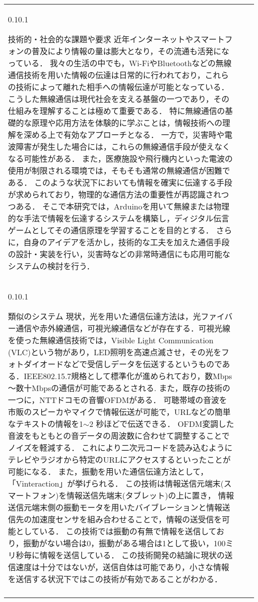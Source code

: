 \documentclass[a4j,11pt,dvipdfmx]{jsarticle}
\makeatletter
\renewcommand{\subsection}{%
    \@startsection{subsection}{1}{\z@}%
    {0.1\Cvs}{0.1\Cvs}%
    {\normalfont\headfont\raggedright}}
\newcommand{\bhline}{\noalign{\hrule height 1pt}}
\makeatother
\begin{document}
\begin{table}[H]
\vspace{-1em}
\centering
\begin{tabular}{bp{}b}
\bhline
\subsection{技術的・社会的な課題や要求}
近年インターネットやスマートフォンの普及により情報の量は膨大となり，その流通も活発になっている\cite{1}．
我々の生活の中でも，Wi-FiやBluetoothなどの無線通信技術を用いた情報の伝達は日常的に行われており，これらの技術によって離れた相手への情報伝達が可能となっている\cite{2}．
こうした無線通信は現代社会を支える基盤の一つであり，その仕組みを理解することは極めて重要である．
特に無線通信の基礎的な原理や応用方法を体験的に学ぶことは，情報技術への理解を深める上で有効なアプローチとなる．
一方で，災害時や電波障害が発生した場合には，これらの無線通信手段が使えなくなる可能性がある．
また，医療施設や飛行機内といった電波の使用が制限される環境では，そもそも通常の無線通信が困難である．
このような状況下においても情報を確実に伝達する手段が求められており，物理的な通信方法の重要性が再認識されつつある\cite{2.5}．
そこで本研究では，Arduinoを用いて無線または物理的な手法で情報を伝達するシステムを構築し，ディジタル伝言ゲームとしてその通信原理を学習することを目的とする．
さらに，自身のアイデアを活かし，技術的な工夫を加えた通信手段の設計・実装を行い，災害時などの非常時通信にも応用可能なシステムの検討を行う．	
	\\ \bhline
\subsection{類似のシステム}
現状，光を用いた通信伝達方法は，光ファイバー通信や赤外線通信，可視光線通信などが存在する．可視光線を使った無線通信技術では，Visible Light Communication (VLC)という物があり，LED照明を高速点滅させ，その光をフォトダイオードなどで受信しデータを伝送するというものである．IEEE802.15.7規格として標準化が進められており，数Mbps～数十Mbpsの通信が可能であるとされる\cite{3}.
また，既存の技術の一つに，NTTドコモの音響OFDMがある\cite{ref:ofdm}\cite{ref:ofdm_docomo}．
可聴帯域の音波を市販のスピーカやマイクで情報伝送が可能で，URLなどの簡単なテキストの情報を1$\sim$2 秒ほどで伝送できる．
OFDM変調した音波をもともとの音データの周波数に合わせて調整することでノイズを軽減する．
これにより二次元コードを読み込むようにテレビやラジオから特定のURLにアクセスするといったことが可能になる．
また，振動を用いた通信伝達方法として，「Vinteraction」が挙げられる．
この技術は情報送信元端末(スマートフォン)を情報送信先端末(タブレット)の上に置き，
情報送信元端末側の振動モータを用いたバイブレーションと情報送信先の加速度センサを組み合わせることで，情報の送受信を可能としている．
この技術では振動の有無で情報を送信しており，振動がない場合は0，振動がある場合は1として扱い，100ミリ秒毎に情報を送信している．
この技術開発の結論に現状の送信速度は十分ではないが，送信自体は可能であり，小さな情報を送信する状況下ではこの技術が有効であることがわかる\cite{jiturei}．
	 \\ \bhline

\end{tabular}
\end{table}
\end{document}
